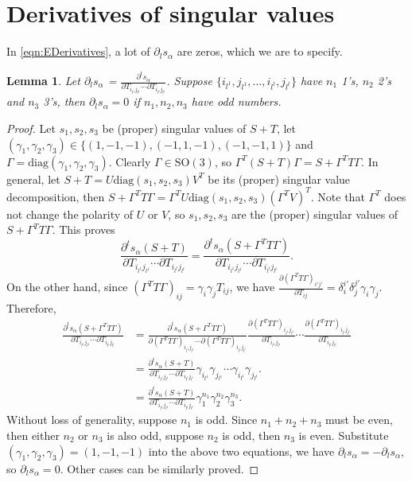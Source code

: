 \documentclass[10pt]{article}
\newtheorem{lemma}{Lemma}
\newcommand{\SO}{\ensuremath{\mathrm{SO(3)}}}
\begin{document}
\section{Derivatives of singular values}
In \eqref{eqn:EDerivatives}, a lot of $\partial_l s_\alpha$ are zeros, which we are to specify.
\begin{lemma} \label{lemma:zeroDsDT}
	Let $\partial_l s_\alpha$ = $\frac{\partial^t s_\alpha}{\partial T_{i_{l^1}j_{l^1}} \cdots \partial T_{i_{l^t}j_{l^t}}}$.
	Suppose $\{i_{l^1},j_{l^1},\ldots,i_{l^t},j_{l^t}\}$ have $n_1$ 1's, $n_2$ 2's and $n_3$ 3's, then $\partial_l s_\alpha = 0$ if $n_1,n_2,n_3$ have odd numbers.
\end{lemma}
\begin{proof}
	Let $s_1,s_2,s_3$ be (proper) singular values of $S+T$, let $(\gamma_1,\gamma_2,\gamma_3) \in \{(1,-1,-1),(-1,1,-1),(-1,-1,1)\}$ and $\Gamma = \mathrm{diag}(\gamma_1,\gamma_2,\gamma_3)$.
	Clearly $\Gamma\in\SO$, so $\Gamma^T(S+T)\Gamma = S+\Gamma^TT\Gamma$.
	In general, let $S+T = U\mathrm{diag}(s_1,s_2,s_3)V^T$ be its (proper) singular value decomposition, then $S+\Gamma^TT\Gamma = \Gamma^TU\mathrm{diag}(s_1,s_2,s_3)(\Gamma^TV)^T$.
	Note that $\Gamma^T$ does not change the polarity of $U$ or $V$, so $s_1,s_2,s_3$ are the (proper) singular values of $S+\Gamma^TT\Gamma$.
	This proves
	\begin{equation*}
		\frac{\partial^t s_\alpha(S+T)}{\partial T_{i_{l^1}j_{l^1}} \cdots \partial T_{i_{l^t}j_{l^t}}} = \frac{\partial^t s_\alpha(S+\Gamma^TT\Gamma)}{\partial T_{i_{l^1}j_{l^1}} \cdots \partial T_{i_{l^t}j_{l^t}}}.
	\end{equation*}
	On the other hand, since $(\Gamma^TT\Gamma)_{ij} = \gamma_i\gamma_jT_{ij}$, we have $\frac{\partial (\Gamma^TT\Gamma)_{i'j'}}{\partial T_{ij}} = \delta_i^{i'}\delta_j^{j'}\gamma_i\gamma_j$.
	Therefore,
	\begin{align*}
		\frac{\partial^t s_\alpha(S+\Gamma^TT\Gamma)}{\partial T_{i_{l^1}j_{l^1}} \cdots \partial T_{i_{l^t}j_{l^t}}} &= \frac{\partial^t s_\alpha(S+\Gamma^TT\Gamma)}{\partial (\Gamma^TT\Gamma)_{i_{l^1}j_{l^1}} \cdots \partial (\Gamma^TT\Gamma)_{i_{l^t}j_{l^t}}} \frac{\partial (\Gamma^TT\Gamma)_{i_{l^1}j_{l^1}}}{\partial T_{i_{l^1}j_{l^1}}} \cdots \frac{\partial (\Gamma^TT\Gamma)_{i_{l^t}j_{l^t}}}{\partial T_{i_{l^t}j_{l^t}}} \\
		&= \frac{\partial^t s_\alpha(S+T)}{\partial T_{i_{l^1}j_{l^1}} \cdots \partial T_{i_{l^t}j_{l^t}}} \gamma_{i_{l^1}}\gamma_{j_{l^1}} \cdots \gamma_{i_{l^t}}\gamma_{j_{l^t}}. \\
		&= \frac{\partial^t s_\alpha(S+T)}{\partial T_{i_{l^1}j_{l^1}} \cdots \partial T_{i_{l^t}j_{l^t}}} \gamma_1^{n_1} \gamma_2^{n_2} \gamma_3^{n_3}.
	\end{align*}
	Without loss of generality, suppose $n_1$ is odd. Since $n_1+n_2+n_3$ must be even, then either $n_2$ or $n_3$ is also odd, suppose $n_2$ is odd, then $n_3$ is even.
	Substitute $(\gamma_1,\gamma_2,\gamma_3) = (1,-1,-1)$ into the above two equations, we have $\partial_l s_\alpha = -\partial_l s_\alpha$, so $\partial_l s_\alpha = 0$.
	Other cases can be similarly proved.
\end{proof}
\end{document}
